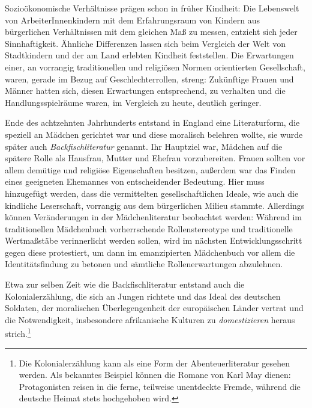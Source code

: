     Sozioökonomische Verhältnisse prägen  schon in früher Kindheit: Die
    Lebenswelt von ArbeiterInnenkindern mit dem Erfahrungsraum von Kindern aus
    bürgerlichen Verhältnissen mit dem gleichen Maß zu messen, entzieht sich
    jeder Sinnhaftigkeit. Ähnliche Differenzen lassen sich beim Vergleich der
    Welt von Stadtkindern und der am Land erlebten Kindheit feststellen. Die
    Erwartungen einer, an vorrangig traditionellen und religiösen Normen
    orientierten Gesellschaft, waren, gerade im Bezug auf Geschlechterrollen,
    streng:  Zukünftige Frauen und Männer hatten sich, diesen Erwartungen
    entsprechend, zu verhalten und die Handlungsspielräume waren, im Vergleich
    zu heute, deutlich geringer.

    Ende des achtzehnten Jahrhunderts entstand in England eine Literaturform,
    die speziell an Mädchen gerichtet war und diese moralisch belehren wollte,
    sie wurde später auch \emph{Backfischliteratur} genannt. Ihr Hauptziel war,
    Mädchen auf die spätere Rolle als Hausfrau, Mutter und Ehefrau
    vorzubereiten. Frauen sollten vor allem demütige und religiöse Eigenschaften
    besitzen, außerdem war das Finden eines geeigneten Ehemannes von
    entscheidender Bedeutung. Hier muss hinzugefügt werden, dass   die
    vermittelten gesellschaftlichen Ideale, wie auch die kindliche Leserschaft,
    vorrangig aus dem bürgerlichen Milieu stammte. Allerdings können
    Veränderungen in der Mädchenliteratur beobachtet werden: Während im
    traditionellen Mädchenbuch vorherrschende Rollenstereotype und traditionelle
    Wertmaßstäbe verinnerlicht werden sollen, wird im nächsten
    Entwicklungsschritt gegen diese protestiert, um dann im emanzipierten
    Mädchenbuch vor allem die Identitätsfindung zu betonen und sämtliche
    Rollenerwartungen abzulehnen.

    Etwa zur selben Zeit wie die Backfischliteratur entstand auch die
    Kolonialerzählung, die sich an Jungen richtete und das Ideal des deutschen
    Soldaten, der moralischen Überlegengenheit der europäischen Länder vertrat
    und die Notwendigkeit, insbesondere afrikanische Kulturen zu
    \emph{domestizieren} heraus strich.\footnote{Die Kolonialerzählung kann als
    eine Form der Abenteuerliteratur gesehen werden. Als bekanntes Beispiel
    können die Romane von Karl May dienen: Protagonisten reisen in die ferne,
    teilweise unentdeckte Fremde, während die deutsche Heimat stets hochgehoben
    wird.} \parencite[23]{Kaminski1989}

